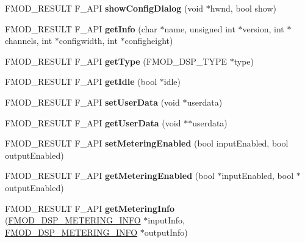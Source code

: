 \begin{DoxyCompactItemize}
\item 
\mbox{\label{classFMOD_1_1DSP_a9a77cb36dbbc0bb053b42eb4d2dcd1f7}} 
F\+M\+O\+D\+\_\+\+R\+E\+S\+U\+LT F\+\_\+\+A\+PI {\bfseries show\+Config\+Dialog} (void $\ast$hwnd, bool show)
\item 
\mbox{\label{classFMOD_1_1DSP_a5bb61015d7b0e835437e46ea4eaf6442}} 
F\+M\+O\+D\+\_\+\+R\+E\+S\+U\+LT F\+\_\+\+A\+PI {\bfseries get\+Info} (char $\ast$name, unsigned int $\ast$version, int $\ast$channels, int $\ast$configwidth, int $\ast$configheight)
\item 
\mbox{\label{classFMOD_1_1DSP_a7241c2669554667f90d4f2a576f64c4a}} 
F\+M\+O\+D\+\_\+\+R\+E\+S\+U\+LT F\+\_\+\+A\+PI {\bfseries get\+Type} (F\+M\+O\+D\+\_\+\+D\+S\+P\+\_\+\+T\+Y\+PE $\ast$type)
\item 
\mbox{\label{classFMOD_1_1DSP_aaada6f5f69622219628cefce0185dec2}} 
F\+M\+O\+D\+\_\+\+R\+E\+S\+U\+LT F\+\_\+\+A\+PI {\bfseries get\+Idle} (bool $\ast$idle)
\item 
\mbox{\label{classFMOD_1_1DSP_a5aacd4725dbe50b725146bd6c412b0f4}} 
F\+M\+O\+D\+\_\+\+R\+E\+S\+U\+LT F\+\_\+\+A\+PI {\bfseries set\+User\+Data} (void $\ast$userdata)
\item 
\mbox{\label{classFMOD_1_1DSP_a1b9014166d1ad45923da3227d8db3439}} 
F\+M\+O\+D\+\_\+\+R\+E\+S\+U\+LT F\+\_\+\+A\+PI {\bfseries get\+User\+Data} (void $\ast$$\ast$userdata)
\item 
\mbox{\label{classFMOD_1_1DSP_a6632c3020c1a14c13786bab1a3d42688}} 
F\+M\+O\+D\+\_\+\+R\+E\+S\+U\+LT F\+\_\+\+A\+PI {\bfseries set\+Metering\+Enabled} (bool input\+Enabled, bool output\+Enabled)
\item 
\mbox{\label{classFMOD_1_1DSP_af5817c9b777dd6b55f8f5bc53cd3fe17}} 
F\+M\+O\+D\+\_\+\+R\+E\+S\+U\+LT F\+\_\+\+A\+PI {\bfseries get\+Metering\+Enabled} (bool $\ast$input\+Enabled, bool $\ast$output\+Enabled)
\item 
\mbox{\label{classFMOD_1_1DSP_ad3089cd60092068633a1be0d1771e366}} 
F\+M\+O\+D\+\_\+\+R\+E\+S\+U\+LT F\+\_\+\+A\+PI {\bfseries get\+Metering\+Info} (\hyperlink{structFMOD__DSP__METERING__INFO}{F\+M\+O\+D\+\_\+\+D\+S\+P\+\_\+\+M\+E\+T\+E\+R\+I\+N\+G\+\_\+\+I\+N\+FO} $\ast$input\+Info, \hyperlink{structFMOD__DSP__METERING__INFO}{F\+M\+O\+D\+\_\+\+D\+S\+P\+\_\+\+M\+E\+T\+E\+R\+I\+N\+G\+\_\+\+I\+N\+FO} $\ast$output\+Info)
$$
\end{DoxyCompactItemize}
